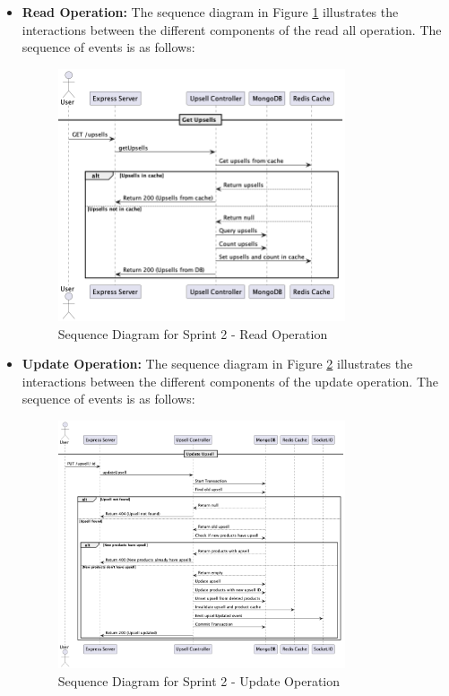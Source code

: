 \begin{itemize}
    \item \textbf{Read Operation:} The sequence diagram in Figure \ref{fig:sequence_diagram_sprint2_read} illustrates the interactions between the different components of the read all operation. The sequence of events is as follows:
    \begin{figure}[H]
        \centering
        \includegraphics[width=0.8\textwidth]{images/sprintTwoReadAllSequence.png}
        \caption{Sequence Diagram for Sprint 2 - Read Operation}
        \label{fig:sequence_diagram_sprint2_read}
    \end{figure}

    \item \textbf{Update Operation:} The sequence diagram in Figure \ref{fig:sequence_diagram_sprint2_update} illustrates the interactions between the different components of the update operation. The sequence of events is as follows:
    \begin{figure}[H]
        \centering
        \includegraphics[width=0.8\textwidth]{images/sprintTwoUpdateSequence.png}
        \caption{Sequence Diagram for Sprint 2 - Update Operation}
        \label{fig:sequence_diagram_sprint2_update}
    \end{figure}


\end{itemize}
